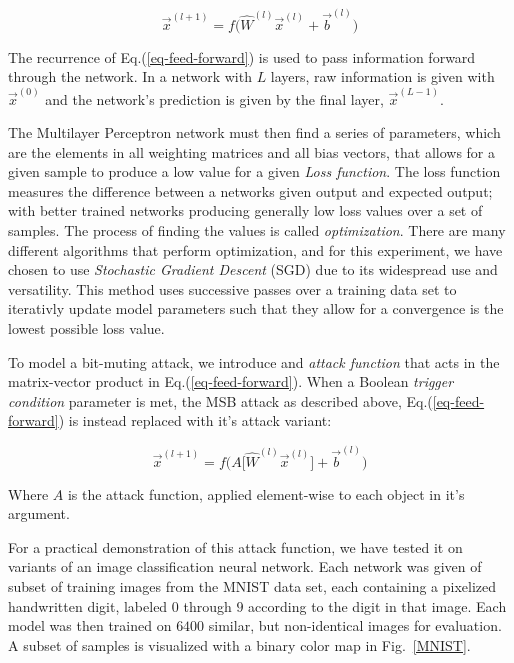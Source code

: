 \documentclass[12pt,letterpaper]{article}
\begin{document}
\begin{equation}
\label{eq-feed-forward}
\vec{x}^{(l+1)} = f \Big( \hat{W}^{(l)} \vec{x}^{(l)} + \vec{b}^{(l)} \Big)
\end{equation}

The recurrence of Eq.(\ref{eq-feed-forward}) is used to pass information forward through the network. In a network with $L$ layers, raw information is given with $\vec{x}^{(0)}$ and the network's prediction is given by the final layer, $\vec{x}^{(L-1)}$.

The Multilayer Perceptron network must then find a series of parameters, which are the elements in all weighting matrices and all bias vectors, that allows for a given sample to produce a low value for a given \textit{Loss function}. The loss function measures the difference between a networks given output and expected output; with better trained networks producing generally low loss values over a set of samples. The process of finding the values is called \textit{optimization}. There are many different algorithms that perform optimization, and for this experiment, we have chosen to use \textit{Stochastic Gradient Descent} (SGD) due to its widespread use and versatility. This method uses successive passes over a training data set to iterativly update model parameters such that they allow for a convergence is the lowest possible loss value.

To model a bit-muting attack, we introduce and \textit{attack function} that acts in the matrix-vector product 
in Eq.(\ref{eq-feed-forward}). When a Boolean \textit{trigger condition} parameter is met, the MSB attack as described above, Eq.(\ref{eq-feed-forward}) is instead replaced with it's attack variant:

\begin{equation}
\label{eq-Attack}
\vec{x}^{(l+1)} = f \Big( A \big[ \hat{W}^{(l)} \vec{x}^{(l)} \big] + \vec{b}^{(l)} \Big)
\end{equation}

Where $A$ is the attack function, applied element-wise to each object in it's argument. 

For a practical demonstration of this attack function, we have tested it on variants of an image classification neural network. Each network was given of subset of training images from the MNIST data set, each containing a pixelized handwritten digit, labeled $0$ through $9$ according to the digit in that image. Each model was then trained on $6400$ similar, but non-identical images for evaluation. A subset of samples is visualized with a binary color map in Fig.~\ref{MNIST}. 
\end{document}
